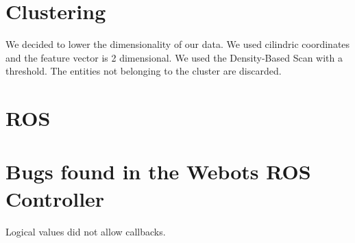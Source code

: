 \documentclass[a4paper]{article}
\begin{document}
	\section{Clustering}
	We decided to lower the dimensionality of our data. We used cilindric coordinates and the feature vector is 2 dimensional.
	We used the Density-Based Scan with a threshold. The entities not belonging to the cluster are discarded.
	
	\section{ROS}
	
	\section{Bugs found in the Webots ROS Controller}
	Logical values did not allow callbacks.
	
	
	
\end{document}
